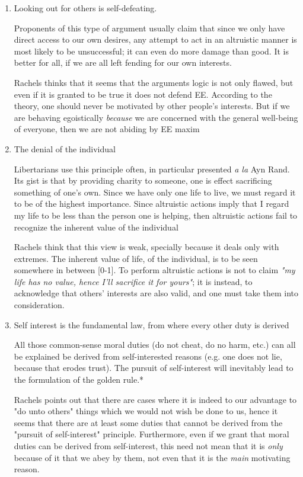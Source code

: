 \documentclass[english,course]{Notes}
\newcommand{\ita}[1]{\textit{#1}}
\begin{document}
\begin{enumerate}

	\item Looking out for others is self-defeating. 
		\par{Proponents of this type of argument usually claim that since we only have direct access to our own desires, any attempt to act in an altruistic manner is most likely to be unsuccessful; it can even do more damage than good. It is better for all, if we are all left fending for our own interests.}
		\par{Rachels thinks that it seems that the arguments logic is not only flawed, but even if it is granted to be true it does not defend EE. According to the theory, one should never be motivated by other people's interests. But if we are behaving egoistically \ita{because} we are concerned with the general well-being of everyone, then we are not abiding by EE maxim}
		
	\item The denial of the individual
		\par{Libertarians use this principle often, in particular presented \ita{a la} Ayn Rand. Its gist is that by providing charity to someone, one is effect sacrificing something of one's own. Since we have only one life to live, we must regard it to be of the highest importance. Since altruistic actions imply that I regard my life to be less than the person one is helping, then altruistic actions fail to recognize the inherent value of the individual}
		\par{Rachels think that this view is weak, specially because it deals only with extremes. The inherent value of life, of the individual, is to be seen somewhere in between [0-1]. To perform altruistic actions is not to claim \ita{"my life has no value, hence I'll sacrifice it for yours"}; it is instead, to acknowledge that others' interests are also valid, and one must take them into consideration.}
		
	\item Self interest is the fundamental law, from where every other duty is derived
		\par{All those common-sense moral duties (do not cheat, do no harm, etc.) can all be explained be derived from self-interested reasons (e.g. one does not lie, because that erodes trust). The pursuit of self-interest will inevitably lead to the formulation of the golden rule.*~}
		\par{Rachels points out that there are cases where it is indeed to our advantage to "do unto others" things which we would not wish be done to us, hence it seems that there are at least some duties that cannot be derived from the "pursuit of self-interest" principle. Furthermore, even if we grant that moral duties can be derived from self-interest, this need not mean that it is \ita{only} because of it that we abey by them, not even that it is the \ita{main} motivating reason.}	
\end{enumerate}
\end{document}
